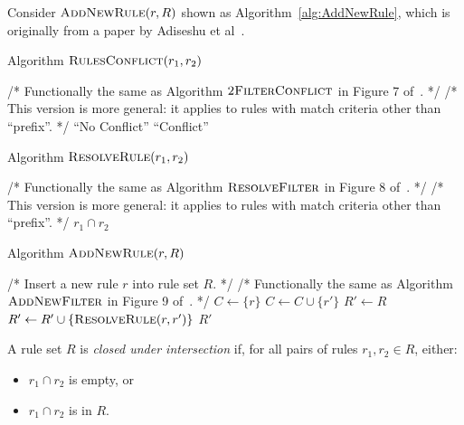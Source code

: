 \documentclass[acmsmall]{acmart}
\begin{document}
Consider $\mathbin{\textsc{AddNewRule}({r},{R})}$ shown as Algorithm~\ref{alg:AddNewRule},
which is originally from a paper by Adiseshu et al~\cite{ASP1999}.

\begin{algorithm}
\caption{Algorithm $\mathbin{\textsc{RulesConflict}({r_1},{r_2})}$}
\label{alg:RulesConflict}
\begin{algorithmic}[1]
  \State /* Functionally the same as Algorithm $\textsc{2FilterConflict}$ in Figure 7 of~\cite{ASP1999}. */
  \State /* This version is more general: it applies to rules with match criteria other than ``prefix''. */
    \State \Return ``No Conflict''
  \Else
    \State \Return ``Conflict''
  \EndIf
\end{algorithmic}
\end{algorithm}

\begin{algorithm}
\caption{Algorithm $\mathbin{\textsc{ResolveRule}({r_1},{r_2})}$}
\label{alg:ResolveRule}
\begin{algorithmic}[1]
  \State /* Functionally the same as Algorithm $\textsc{ResolveFilter}$ in Figure 8 of~\cite{ASP1999}. */
  \State /* This version is more general: it applies to rules with match criteria other than ``prefix''. */
  \State \Return $r_1 \cap r_2$
\end{algorithmic}
\end{algorithm}

\begin{algorithm}
\caption{Algorithm $\mathbin{\textsc{AddNewRule}({r},{R})}$}
\label{alg:AddNewRule}
\begin{algorithmic}[1]
  \State /* Insert a new rule $r$ into rule set $R$. */
  \State /* Functionally the same as Algorithm $\textsc{AddNewFilter}$ in Figure 9 of~\cite{ASP1999}. */
  \State $C \gets \{ r \}$  \label{algline:Cgetsr}
    \State $C \gets C \cup \{ r' \}$   \label{algline:addrprimetoC}
  \EndIf
  \EndFor
  \State $R' \gets R$
    \State $R' \gets R' \cup \{ \mathbin{\textsc{ResolveRule}({r},{r'})} \}$
              \label{algline:addresolveruletoR}
  \EndFor
  \State \Return $R'$
\end{algorithmic}
\end{algorithm}

\begin{definition}
\label{defn:rulesetclosedunderintersection}
A rule set $R$ is {\em closed under intersection} if,
for all pairs of rules $r_1, r_2 \in R$, either:
\begin{itemize}
\item $r_1 \cap r_2$ is empty, or
\item $r_1 \cap r_2$ is in $R$.
\end{itemize}
\end{definition}
\end{document}
